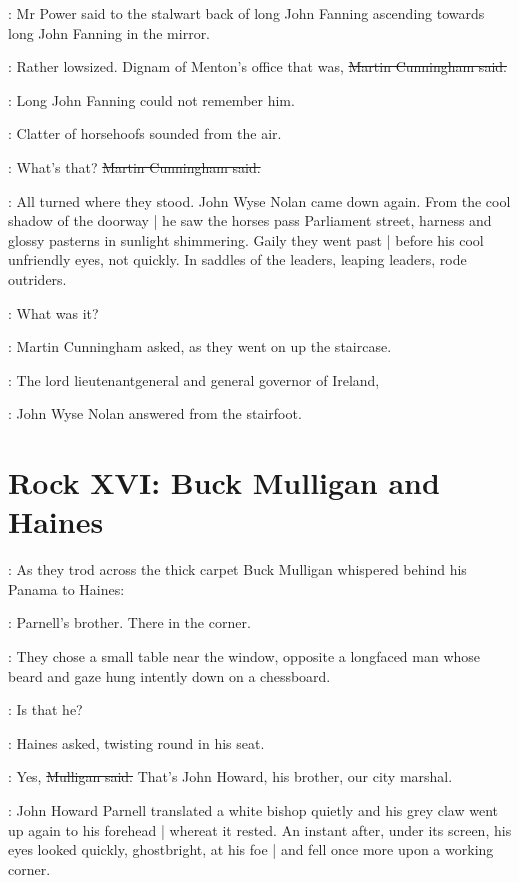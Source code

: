 :
Mr Power said
to the stalwart back of long John Fanning
ascending towards long John Fanning in the mirror.

\cunningham:
Rather lowsized.
Dignam of Menton's office that was,
\sout{Martin Cunningham said.}

:
Long John Fanning could not remember him.%

:
Clatter of horsehoofs sounded from the air.

\cunningham:
What's that?
\sout{Martin Cunningham said.}

:
All turned where they stood.
John Wyse Nolan came down again.
From the cool shadow of the doorway |
he saw the horses pass Parliament street,
harness and glossy pasterns in sunlight shimmering.
Gaily they went past |
before his cool unfriendly eyes,
not quickly.
In saddles of the leaders,
leaping leaders,
rode outriders.

\cunningham:
What was it?

:
Martin Cunningham asked,
as they went on up the staircase.

\johnwyse:
The lord lieutenantgeneral and general governor of Ireland,

:
John Wyse Nolan answered from the stairfoot.


\section*{Rock XVI: Buck Mulligan and Haines}


:
As they trod across the thick carpet
Buck Mulligan whispered behind his Panama to Haines:

\mulligan:
Parnell's brother.
There in the corner.

:
They chose a small table near the window,
opposite a longfaced man
whose beard and gaze hung intently down on a chessboard.

\haines:
Is that he?

:
Haines asked,
twisting round in his seat.

\mulligan:
Yes,
\sout{Mulligan said.}
That's John Howard, his brother, our city marshal.

:
John Howard Parnell translated a white bishop quietly
and his grey claw went up again to his forehead |
whereat it rested.
An instant after,
under its screen,
his eyes looked quickly, ghostbright, at his foe |
and fell once more upon a working corner.

